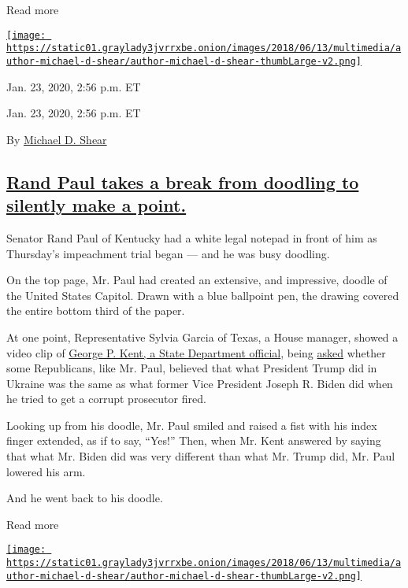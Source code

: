 Read more

\href{https://www.nytimes3xbfgragh.onion/by/michael-d-shear}{\texttt{[image: https://static01.graylady3jvrrxbe.onion/images/2018/06/13/multimedia/author-michael-d-shear/author-michael-d-shear-thumbLarge-v2.png]}}

Jan. 23, 2020, 2:56 p.m. ET

Jan. 23, 2020, 2:56 p.m. ET

By \href{https://www.nytimes3xbfgragh.onion/by/michael-d-shear}{Michael
D. Shear}

\hypertarget{rand-paul-takes-a-break-from-doodling-to-silently-make-a-point}{%
\subsection{\texorpdfstring{\protect\hyperlink{rand-paul-takes-a-break-from-doodling-to-silently-make-a-point}{Rand
Paul takes a break from doodling to silently make a
point.}}{Rand Paul takes a break from doodling to silently make a point.}}\label{rand-paul-takes-a-break-from-doodling-to-silently-make-a-point}}

Senator Rand Paul of Kentucky had a white legal notepad in front of him
as Thursday's impeachment trial began --- and he was busy doodling.

On the top page, Mr. Paul had created an extensive, and impressive,
doodle of the United States Capitol. Drawn with a blue ballpoint pen,
the drawing covered the entire bottom third of the paper.

At one point, Representative Sylvia Garcia of Texas, a House manager,
showed a video clip of
\href{https://www.nytimes3xbfgragh.onion/2019/11/07/us/politics/george-kent-impeachment-testimony.html}{George
P. Kent, a State Department official}, being
\href{https://www.nytimes3xbfgragh.onion/interactive/2019/11/07/us/politics/george-kent-transcript.html}{asked}
whether some Republicans, like Mr. Paul, believed that what President
Trump did in Ukraine was the same as what former Vice President Joseph
R. Biden did when he tried to get a corrupt prosecutor fired.

Looking up from his doodle, Mr. Paul smiled and raised a fist with his
index finger extended, as if to say, ``Yes!'' Then, when Mr. Kent
answered by saying that what Mr. Biden did was very different than what
Mr. Trump did, Mr. Paul lowered his arm.

And he went back to his doodle.

Read more

\href{https://www.nytimes3xbfgragh.onion/by/michael-d-shear}{\texttt{[image: https://static01.graylady3jvrrxbe.onion/images/2018/06/13/multimedia/author-michael-d-shear/author-michael-d-shear-thumbLarge-v2.png]}}

